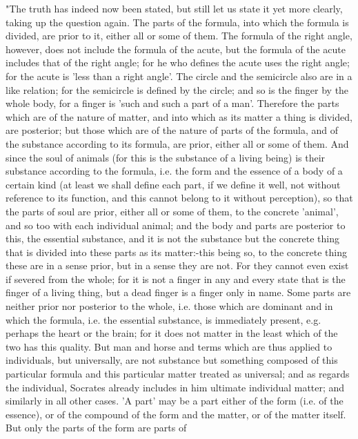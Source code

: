 "The truth has indeed now been stated, but still let us state it yet
more clearly, taking up the question again. The parts of the formula,
into which the formula is divided, are prior to it, either all or
some of them. The formula of the right angle, however, does not include
the formula of the acute, but the formula of the acute includes that
of the right angle; for he who defines the acute uses the right angle;
for the acute is 'less than a right angle'. The circle and the semicircle
also are in a like relation; for the semicircle is defined by the
circle; and so is the finger by the whole body, for a finger is 'such
and such a part of a man'. Therefore the parts which are of the nature
of matter, and into which as its matter a thing is divided, are posterior;
but those which are of the nature of parts of the formula, and of
the substance according to its formula, are prior, either all or some
of them. And since the soul of animals (for this is the substance
of a living being) is their substance according to the formula, i.e.
the form and the essence of a body of a certain kind (at least we
shall define each part, if we define it well, not without reference
to its function, and this cannot belong to it without perception),
so that the parts of soul are prior, either all or some of them, to
the concrete 'animal', and so too with each individual animal; and
the body and parts are posterior to this, the essential substance,
and it is not the substance but the concrete thing that is divided
into these parts as its matter:-this being so, to the concrete thing
these are in a sense prior, but in a sense they are not. For they
cannot even exist if severed from the whole; for it is not a finger
in any and every state that is the finger of a living thing, but a
dead finger is a finger only in name. Some parts are neither prior
nor posterior to the whole, i.e. those which are dominant and in which
the formula, i.e. the essential substance, is immediately present,
e.g. perhaps the heart or the brain; for it does not matter in the
least which of the two has this quality. But man and horse and terms
which are thus applied to individuals, but universally, are not substance
but something composed of this particular formula and this particular
matter treated as universal; and as regards the individual, Socrates
already includes in him ultimate individual matter; and similarly
in all other cases. 'A part' may be a part either of the form (i.e.
of the essence), or of the compound of the form and the matter, or
of the matter itself. But only the parts of the form are parts of
